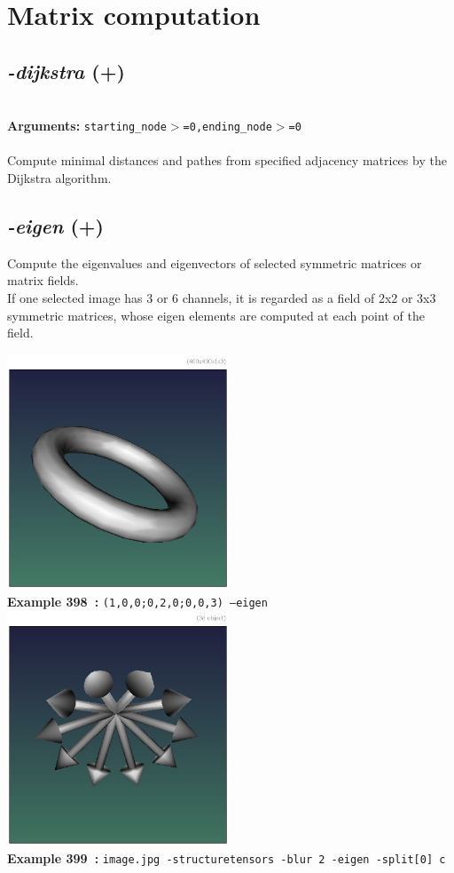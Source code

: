 \documentclass[a4paper,11pt,twoside]{book}
\begin{document}
\section{Matrix computation}


\subsection{\emph{-dijkstra} (+)}\vspace*{-0.5em}
~\\\textbf{Arguments: } 
{\small \texttt{starting\_node$>$=0,ending\_node$>$=0}}\\~\\
Compute minimal distances and pathes from specified adjacency matrices by the Dijkstra algorithm.


\subsection{\emph{-eigen} (+)}\vspace*{-0.5em}
Compute the eigenvalues and eigenvectors of selected symmetric matrices or matrix fields.
~\\If one selected image has 3 or 6 channels, it is regarded as a field of 2x2 or 3x3 symmetric matrices,
whose eigen elements are computed at each point of the field.
\begin{center}\includegraphics[keepaspectratio=true,height=7cm,width=\textwidth]{img/gmic_def398.jpg}\\
{\footnotesize \textbf{Example 398~:} \texttt{(1,0,0;0,2,0;0,0,3) --eigen}}
\\\includegraphics[keepaspectratio=true,height=7cm,width=\textwidth]{img/gmic_def399.jpg}\\
{\footnotesize \textbf{Example 399~:} \texttt{image.jpg -structuretensors -blur 2 -eigen -split[0] c}}
\end{center}
\end{document}
